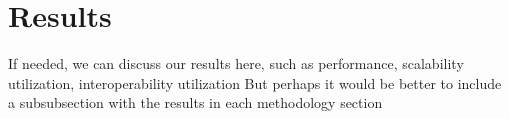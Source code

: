 \section{Results}
If needed, we can discuss our results here, such as performance, scalability utilization, interoperability utilization
But perhaps it would be better to include a subsubsection with the results in each methodology section